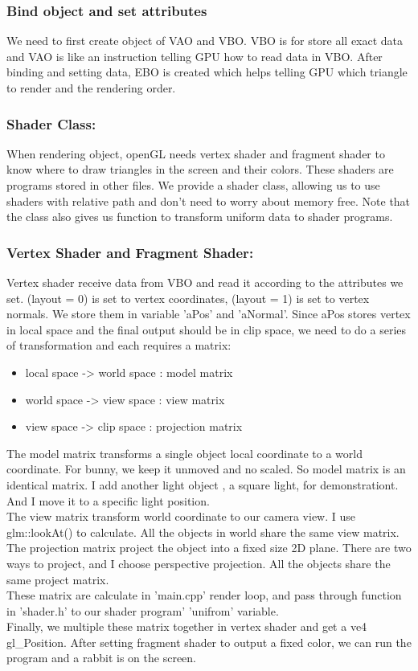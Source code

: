 \documentclass[acmtog]{acmart}
\begin{document}
\subsubsection{Bind object and set attributes}
We need to first create object of VAO and VBO. VBO is for store all exact data and VAO is like an instruction telling GPU how to read data in VBO. After binding and setting data, EBO is created which helps telling GPU which triangle to render and the rendering order.
\subsubsection{Shader Class: }
When rendering object, openGL needs vertex shader and fragment shader to know where to draw triangles in the screen and their colors. These shaders are programs stored in other files. We provide a shader class, allowing us to use shaders with relative path and don't need to worry about memory free. Note that the class also gives us function to transform uniform data to shader programs.
\subsubsection{Vertex Shader and Fragment Shader: }
Vertex shader receive data from VBO and read it according to the attributes we set. (layout = 0) is set to vertex coordinates, (layout = 1) is set to vertex normals. We store them in variable 'aPos' and 'aNormal'.
Since  aPos stores vertex in local space and the final output should be in clip space, we need to do a series of transformation and each requires a matrix:
\begin{itemize}
	\item local space -> world space : model matrix
	\item world space -> view space : view matrix
	\item view space -> clip space : projection matrix
\end{itemize}
The model matrix transforms a single object local coordinate to a world coordinate. For bunny, we keep it unmoved and no scaled. So model matrix is an identical matrix. I add another light object , a square light, for demonstrationt. And I move it to a specific light position.\\
The view matrix transform world coordinate to our camera view. I use glm::lookAt() to calculate. All the objects in world share the same view matrix.\\
The projection matrix project the object into a fixed size 2D plane. There are two ways to project, and I choose perspective projection. All the objects share the same project matrix.\\
These matrix are calculate in 'main.cpp' render loop, and pass through function in 'shader.h' to our shader program' 'unifrom' variable.\\
Finally, we multiple these matrix together in vertex shader and get a ve4 gl\_Position. After setting fragment shader to output a fixed color, we can run the program and a rabbit is on the screen.
\end{document}
